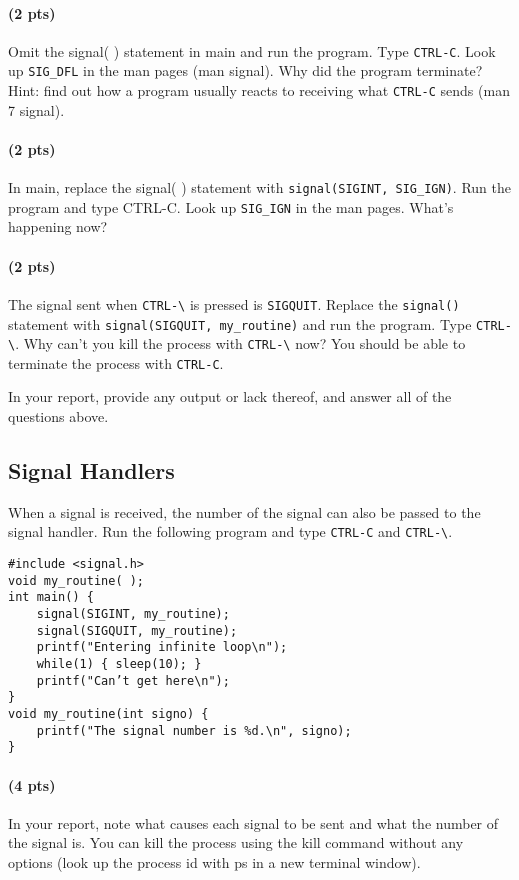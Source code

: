 \documentclass[letterpaper,10pt]{article}
\begin{document}
\paragraph{(2 pts)} Omit the signal( ) statement in main and run the program. Type \verb+CTRL-C+. Look up \verb+SIG_DFL+
in the man pages (man signal). Why did the program terminate? Hint: find out how a program usually
reacts to receiving what \verb+CTRL-C+ sends (man 7 signal).

\paragraph{(2 pts)} In main, replace the signal( ) statement with \verb-signal(SIGINT, SIG_IGN)-. Run the program and
type CTRL-C. Look up \verb-SIG_IGN- in the man pages. What’s happening now?

\paragraph{(2 pts)} The signal sent when \verb+CTRL-\+ is pressed is \verb-SIGQUIT-. Replace the \verb-signal()- statement with
\verb+signal(SIGQUIT, my_routine)+ and run the program. Type \verb+CTRL-\+. Why can't you kill the process with
\verb+CTRL-\+ now? You should be able to terminate the process with \verb+CTRL-C+.

In your report, provide any output or lack thereof, and answer all of the questions above.


\subsection{Signal Handlers}
When a signal is received, the number of the signal can also be passed to the signal handler.
Run the following program and type \verb+CTRL-C+ and \verb+CTRL-\+.
\begin{verbatim}
#include <signal.h>
void my_routine( );
int main() {
    signal(SIGINT, my_routine);
    signal(SIGQUIT, my_routine);
    printf("Entering infinite loop\n");
    while(1) { sleep(10); }
    printf("Can’t get here\n");
}
void my_routine(int signo) {
    printf("The signal number is %d.\n", signo);
}
\end{verbatim}

\paragraph{(4 pts)} In your report, note what causes each signal to be sent and what the number of the
signal is.
You can kill the process using the kill command without any options (look up the process id with
ps in a new terminal window).
\end{document}
